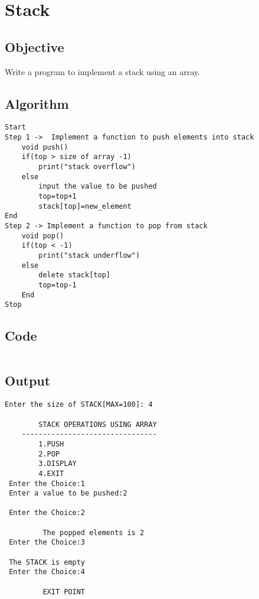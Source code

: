 \section{Stack}
\label{sec:Stack}

\subsection{Objective}
Write a program to implement a stack using an array.

\subsection{Algorithm}
\begin{lstlisting}[style=mystyle]
Start
Step 1 ->  Implement a function to push elements into stack
    void push()
    if(top > size of array -1)
        print("stack overflow")
    else
        input the value to be pushed
        top=top+1
        stack[top]=new_element
End
Step 2 -> Implement a function to pop from stack
    void pop()
    if(top < -1)
        print("stack underflow")
    else
        delete stack[top]
        top=top-1
    End
Stop
\end{lstlisting}

\subsection{Code}
\inputminted[]{c}{../../Code/stack.c}

\subsection{Output}
\begin{lstlisting}[style=output]
  Enter the size of STACK[MAX=100]: 4

        STACK OPERATIONS USING ARRAY
    --------------------------------
        1.PUSH
        2.POP
        3.DISPLAY
        4.EXIT
 Enter the Choice:1
 Enter a value to be pushed:2

 Enter the Choice:2

         The popped elements is 2
 Enter the Choice:3

 The STACK is empty
 Enter the Choice:4

         EXIT POINT
\end{lstlisting}

\pagebreak
